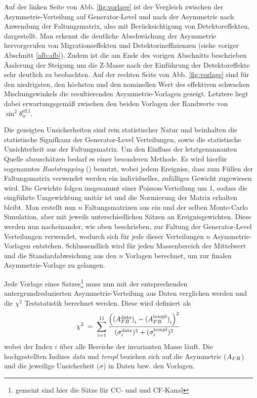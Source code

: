 Auf der linken Seite von Abb. \ref{fig:vorlage} ist der Vergleich zwischen der
Asymmetrie-Verteilung auf Generator-Level und nach der Asymmetrie nach
Anwendung der Faltungsmatrix, also mit Berücksichtigung von Detektoreffekten,
dargestellt. Man erkennt die deutliche Abschwächung der Asymmetrie
hervorgerufen von Migrationseffekten und Detektorineffizienzen (siehe voriger
Abschnitt \ref{afb:afb}). Zudem ist die am Ende des vorigen Abschnitts
beschrieben Änderung der Steigung um die Z-Masse nach der Einführung der
Detektoreffekte sehr deutlich zu beobachten. Auf der rechten Seite von Abb.
\ref{fig:vorlage} sind für den niedrigsten, den höchsten und den nominellen
Wert des effektiven schwachen Mischungswinkels die resultierenden
Asymmetrie-Vorlagen gezeigt. Letztere liegt dabei erwartungsgemäß zwischen den
beiden Vorlagen der Randwerte von $\sin^2\theta_w^\text{eff,l}$.

Die gezeigten Unsicherheiten sind rein statistischer Natur und beinhalten die
statistische Signifkanz der Generator-Level Verteilungen, sowie die
statistische Unsichterheit aus der Faltungsmatrix. Um den Einfluss der
letztgenannanten Quelle abzuschätzen bedarf es einer besonderen Methode. Es
wird hierfür sogenanntes \textit{Bootstrapping} (\cite{zbMATH03631774})
benutzt, wobei jedem Ereigniss, dass zum Füllen der Faltungsmatrix verwendet
werden ein individuelles, zufälliges Gewicht zugewiesen wird. Die Gewichte
folgen insgesammt einer Poisson-Verteilung um 1, sodass die eingführte
Umgewichtung unitär ist und die Normierung der Matrix erhalten bleibt. Man
erstellt nun $n$ Faltungsmatrizen aus ein und der selben Monte-Carlo
Simulation, aber mit jeweils unterschiedlichen Sätzen an Ereignisgewichten.
Diese werden nun nacheinander, wie oben beschrieben, zur Faltung der
Generator-Level Verteilungen verwendet, wodurch sich für jede dieser
Verteilungen $n$ Asymmetrie-Vorlagen entstehen. Schlussendlich wird für jeden
Massenbereich der Mittelwert und die Standardabweichung aus den $n$ Vorlagen
berechnet, um zur finalen Asymmetrie-Vorlage zu gelangen.

Jede Vorlage eines Satzes\footnote{gemeint sind hier die Sätze für \ac{CC}- und
und \ac{CF}-Kanal} muss nun mit der entsprechenden untergrundreduzierten
Asymmetrie-Verteilung aus Daten verglichen werden und die $\chi^2$
Teststatistik berechnet werden. Diese wird definiert als
\begin{equation}
    \chi^2 \;=\; \sum_{i=1}^{11}
        \frac{
            \left(
                {(A_{FB}^\text{data})}_i - {(A_{FB}^\text{templ})}_i
            \right)^2
        }{
            (\sigma_i^\text{data})^2 + (\sigma_i^\text{templ})^2
        }
\end{equation}
wobei der Index $i$ über alle Bereiche der invarianten Masse läuft. Die
hochgestellten Indizes \textit{data} und \textit{templ} beziehen sich auf die
Asymmetrie ($A_{FB}$) und die jeweilige Unsicherheit ($\sigma$) in Daten bzw. den
Vorlagen.



